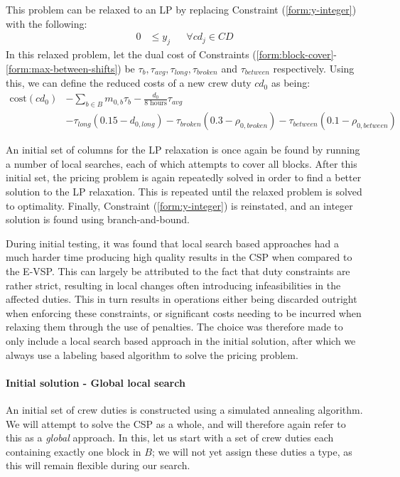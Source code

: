 \documentclass[]{article}
\begin{document}
This problem can be relaxed to an LP by replacing Constraint (\ref{form:y-integer}) with the following:
\begin{align}
0 &\leq y_{j} && \forall cd_j \in \textit{CD}
\end{align}
In this relaxed problem, let the dual cost of Constraints (\ref{form:block-cover}-\ref{form:max-between-shifts}) be $\tau_{b}, \tau_{\textit{avg}}, \tau_{\textit{long}}, \tau_{\textit{broken}}$ and $\tau_{\textit{between}}$ respectively. Using this, we can define the reduced costs of a new crew duty $cd_0$ as being: 
\begin{align}
\text{cost}(cd_0) 
&- \sum_{b \in B} m_{0,b} \tau_{b} 
- \frac{d_0}{\text{8 hours}} \tau_{\textit{avg}} \nonumber \\
&- \tau_{\textit{long}} (0.15 - d_{0,\textit{long}}) 
- \tau_{\textit{broken}} (0.3 - \rho_{0,\textit{broken}}) 
- \tau_{\textit{between}} (0.1 - \rho_{0,\textit{between}})
\end{align}

An initial set of columns for the LP relaxation is once again be found by running a number of local searches, each of which attempts to cover all blocks. After this initial set, the pricing problem is again repeatedly solved in order to find a better solution to the LP relaxation. This is repeated until the relaxed problem is solved to optimality. Finally, Constraint (\ref{form:y-integer}) is reinstated, and an integer solution is found using branch-and-bound.

During initial testing, it was found that local search based approaches had a much harder time producing high quality results in the CSP when compared to the E-VSP. This can largely be attributed to the fact that duty constraints are rather strict, resulting in local changes often introducing infeasibilities in the affected duties. This in turn results in operations either being discarded outright when enforcing these constraints, or significant costs needing to be incurred when relaxing them through the use of penalties. The choice was therefore made to only include a local search based approach in the initial solution, after which we always use a labeling based algorithm to solve the pricing problem.   

\paragraph{Initial solution - Global local search}
An initial set of crew duties is constructed using a simulated annealing algorithm. We will attempt to solve the CSP as a whole, and will therefore again refer to this as a \emph{global} approach. In this, let us start with a set of crew duties each containing exactly one block in $B$; we will not yet assign these duties a type, as this will remain flexible during our search. 
\end{document}
